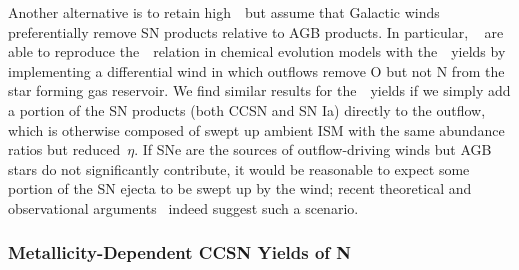 \documentclass[ms.tex]{subfiles}
\begin{document}
\par
Another alternative is to retain high~~but assume that Galactic winds
preferentially remove SN products relative to AGB products. In particular,
~\citet{Vincenzo2016a} are able to reproduce the~\ohno~relation
in chemical evolution models with the~\ventura~yields by implementing a
differential wind in which outflows remove O but not N from the star forming
gas reservoir.
We find similar results for the~\ventura~yields if we simply add a portion of
the SN products (both CCSN and SN Ia) directly to the outflow, which is
otherwise composed of swept up ambient ISM with the same abundance ratios but
reduced~$\eta$.
If SNe are the sources of outflow-driving winds but AGB stars do not
significantly contribute, it would be reasonable to expect some portion of
the SN ejecta to be swept up by the wind; recent theoretical
\citep{Christensen2018} and observational arguments~\citep*{Chisholm2018}
indeed suggest such a scenario.

\subsubsection{Metallicity-Dependent CCSN Yields of N}
\label{sec:results:yields:yncc}
\end{document}
